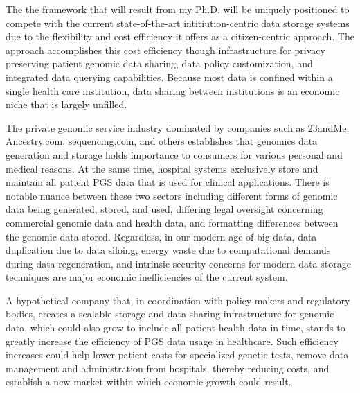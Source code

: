 \documentclass[a4paper,11pt]{article}
\begin{document}
\begin{refsection}
The the framework that will result from my Ph.D. will be uniquely positioned to compete with the current state-of-the-art intitiution-centric data storage systems due to the flexibility and cost efficiency it offers as a citizen-centric approach.
The approach accomplishes this cost efficiency though infrastructure for privacy preserving patient genomic data sharing, data policy customization, and integrated data querying capabilities.
Because most data is confined within a single health care institution, data sharing between institutions is an economic niche that is largely unfilled. 

The private genomic service industry dominated by companies such as 23andMe, Ancestry.com, sequencing.com, and others establishes that genomics data generation and storage holds importance to consumers for various personal and medical reasons. 
At the same time, hospital systems exclusively store and maintain all patient PGS data that is used for clinical applications. 
There is notable nuance between these two sectors including different forms of genomic data being generated, stored, and used, differing legal oversight concerning commercial genomic data and health data, and formatting differences between the genomic data stored. 
Regardless, in our modern age of big data, data duplication due to data siloing, energy waste due to computational demands during data regeneration, and intrinsic security concerns for modern data storage techniques are major economic inefficiencies of the current system. 

A hypothetical company that, in coordination with policy makers and regulatory bodies, creates a scalable storage and data sharing infrastructure for genomic data, which could also grow to include all patient health data in time, stands to greatly increase the efficiency of PGS data usage in healthcare. 
Such efficiency increases could help lower patient costs for specialized genetic tests, remove data management and administration from hospitals, thereby reducing costs, and establish a new market within which economic growth could result. 


\end{refsection}
\end{document}
